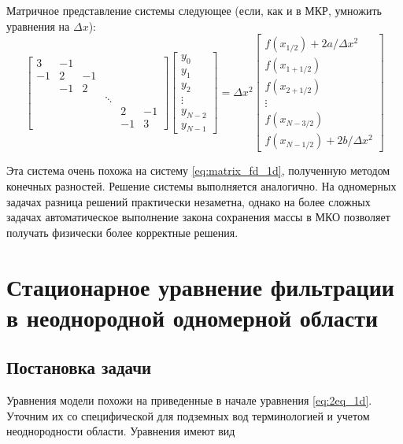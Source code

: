 \documentclass[a4paper, 11pt]{article}
\begin{document}
Матричное представление системы следующее (если, как и в МКР, умножить уравнения на $\Delta x$):
\begin{equation}\label{eq:matrix_1d_fv}
	\begin{bmatrix}
		3  & -1 &   &       \\
		-1 &  2 & -1 \\
		& -1 &  2 \\
		&    &   & \ddots \\
		&    &   &       &  2 & -1\\
		&    &   &       & -1 & 3
		
	\end{bmatrix}
	\begin{bmatrix}
		y_0 \\ y_1 \\ y_2 \\ \vdots \\y_{N-2} \\ y_{N-1}
	\end{bmatrix}
	=
	\Delta x^2 
	\begin{bmatrix}
		f(x_{1/2}) + 2a/\Delta x^2 \\
		f(x_{1+1/2})\\
		f(x_{2+1/2})\\
		\vdots\\
		f(x_{N-3/2})\\
		f(x_{N-1/2}) + 2b/\Delta x^2 
	\end{bmatrix}
\end{equation}

Эта система очень похожа на систему \eqref{eq:matrix_fd_1d}, полученную методом конечных разностей. Решение системы выполняется аналогично. На одномерных задачах 
разница решений практически незаметна, однако на более сложных задачах автоматическое выполнение закона сохранения массы в МКО позволяет получать физически более
корректные решения.

\section{Стационарное уравнение фильтрации в неоднородной одномерной области}
\subsection{Постановка задачи}
Уравнения модели похожи на приведенные в начале уравнения \eqref{eq:2eq_1d}. Уточним их со специфической для подземных вод терминологией и учетом неоднородности области. Уравнения имеют вид
\end{document}
